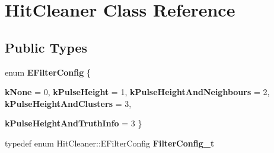 \hypertarget{classHitCleaner}{
\section{HitCleaner Class Reference}
\label{classHitCleaner}
}
\subsection*{Public Types}
\begin{DoxyCompactItemize}
\item 
enum {\bfseries EFilterConfig} \{ \par
{\bfseries kNone} =  0, 
{\bfseries kPulseHeight} =  1, 
{\bfseries kPulseHeightAndNeighbours} =  2, 
{\bfseries kPulseHeightAndClusters} =  3, 
\par
{\bfseries kPulseHeightAndTruthInfo} =  3
 \}
\item 
\hypertarget{classHitCleaner_a417732ebe6c9a62f91a0648522cb5e01}{
typedef enum HitCleaner::EFilterConfig {\bfseries FilterConfig\_\-t}}
\label{classHitCleaner_a417732ebe6c9a62f91a0648522cb5e01}

\end{DoxyCompactItemize}

